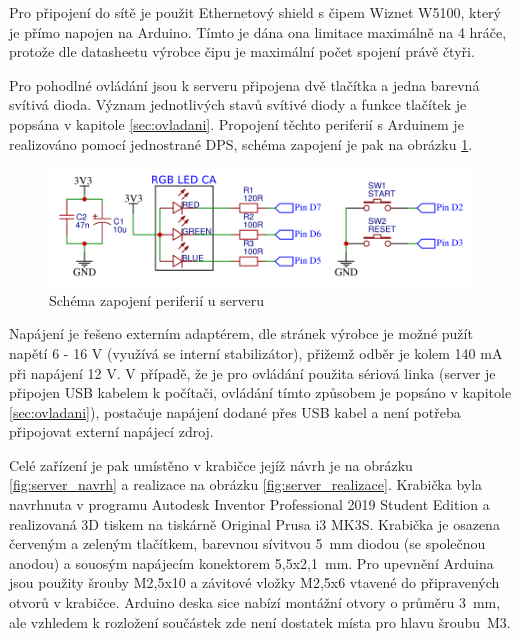 Pro připojení do sítě je použit Ethernetový shield s čipem Wiznet W5100, který je přímo napojen na Arduino. Tímto je dána ona limitace maximálně na 4 hráče, protože dle datasheetu výrobce čipu \cite{datasheet_w5100} je maximální počet spojení právě čtyři.

Pro pohodlné ovládání jsou k serveru připojena dvě tlačítka a jedna barevná svítivá dioda. Význam jednotlivých stavů svítivé diody a funkce tlačítek je popsána v kapitole \ref{sec:ovladani}. Propojení těchto periferií s Arduinem je realizováno pomocí jednostrané DPS, schéma zapojení je pak na obrázku \ref{fig:server_module}.

\begin{figure}[hbtp]
  \centering
  \includegraphics[width=12cm]{img/server_module.png}
  \caption{\label{fig:server_module} Schéma zapojení periferií u serveru}
\end{figure}

Napájení je řešeno externím adaptérem, dle stránek výrobce \cite{ArdDue_web} je možné pužít napětí 6 - 16 V (využívá se interní stabilizátor), přižemž odběr je kolem 140 mA při napájení 12 V. V případě, že je pro ovládání použita sériová linka (server je připojen USB kabelem k počítači, ovládání tímto způsobem je popsáno v kapitole \ref{sec:ovladani}), postačuje napájení dodané přes USB kabel a není potřeba připojovat externí napájecí zdroj.

Celé zařízení je pak umístěno v krabičce jejíž návrh je na obrázku \ref{fig:server_navrh} a realizace na obrázku \ref{fig:server_realizace}. Krabička byla navrhnuta v programu Autodesk Inventor Professional 2019 Student Edition a realizovaná 3D tiskem na tiskárně Original Prusa i3 MK3S. Krabička je osazena červeným a zeleným tlačítkem, barevnou sívitvou 5~mm diodou (se společnou anodou) a souosým napájecím konektorem 5,5x2,1~mm. Pro upevnění Arduina jsou použity šrouby M2,5x10 a závitové vložky M2,5x6 vtavené do připravených otvorů v krabičce. Arduino deska sice nabízí montážní otvory o průměru 3~mm, ale vzhledem k rozložení součástek zde není dostatek místa pro hlavu šroubu~M3.

